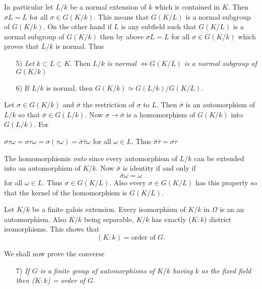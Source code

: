 In particular let $L/k$ be a normal extension of $k$ which is
contained in $K$. Then $\sigma L = L$ for all $\sigma \in
G(K/k)$. This means that $G(K/L)$ is a normal subgroup of $G(K/k)$. On
the other hand if $L$ is any subfield such that $G(K/L)$ is a normal
subgroup of $G(K/k)$ then by above $\sigma L = L$ for all $\sigma \in
G(K/k)$ which proves that $L/k$ is normal. Thus 
\begin{enumerate}
\item [5)]\textit{Let} $k \subset L \subset K$. Then $L/k$ \textit{is
  normal} $\Longleftrightarrow G(K/L)$ \textit{is a normal subgroup
  of} $G(K/k)$ 

\item [6)] If $L/k$ is normal, then $G(K/k) \simeq G(L/k) / G(K/L)$.
\end{enumerate}

Let $\sigma \in G(K/k)$ and $\bar{\sigma}$ the restriction of $\sigma$
to $L$. Then $\bar{\sigma}$ is an automorphism of $L/k$ so that
$\bar{\sigma} \in G(L/k)$. Now $\sigma \rightarrow \bar{\sigma}$ is a
homomorphism of $G(K/k)$ into $G(L/k)$. For 

$\overline{\sigma \tau} \omega = \sigma \tau \omega = \sigma (\tau
\omega) = \bar{\sigma} \bar{\tau} \omega$ for all $\omega \in L$. Thus
$\bar{\sigma}\bar{\tau} = \overline{\sigma \tau}$ 

The homomorphism\pageoriginale is \textit{onto} since every
automorphism of $L/k$ can be extended into an automorphism of
$K/k$. Now $\bar{\sigma}$ is identity if and only if  
$$
\bar{\sigma} \omega = \omega
$$
for all $\omega \in L$. Thus $\sigma \in G(K/L)$. Also every $\sigma
\in G(K/L)$ has this property so that the kernel of the homomorphism is
$G(K/L)$.  

Let $K/k $ be a finite galois extension. Every isomorphism of $K/k$ in
$\Omega$ is an an automorphism. Also $K/k$ being separable, $K/k$ has
exactly ($K : k$) district isomorphisms. This shows that  
$$
(K : k) = \text{order of } G.
$$

We shall now prove the converse	
\begin{enumerate}
\item [7)] \textit{If $G$ is a finite group of automorphisms
  of $K/k$ having $k$ as the fixed field then ($K :
  k$) = order of $G$}.  
\end{enumerate}

